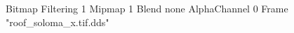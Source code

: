 {Bitmap
	{Filtering 1}
	{Mipmap 1}
	{Blend none}
	{AlphaChannel 0}
	{Frame "roof_soloma_x.tif.dds"}
}
